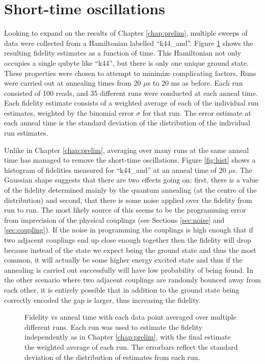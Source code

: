 \section{Short-time oscillations}
Looking to expand on the results of Chapter \ref{chap:prelim}, multiple sweeps of data were collected from a Hamiltonian labelled ``k44\_and''.  Figure \ref{fig:results_avg} shows the resulting fidelity estimates as a function of time.  This Hamiltonian not only occupies a single qubyte like ``k44'', but there is only one unique ground state.  These properties were chosen to attempt to minimize complicating factors.  Runs were carried out at annealing times from 20 $\mu$s to 20 ms as before.  Each run consisted of 100 reads, and 35 different runs were conducted at each anneal time.  Each fidelity estimate consists of a weighted average of each of the individual run estimates, weighted by the binomial error $\sigma$ for that run.
The error estimate at each anneal time is the standard deviation of the distribution of the individual run estimates.

Unlike in Chapter \ref{chap:prelim}, averaging over many runs at the same anneal time has managed to remove the short-time oscillations.  Figure \ref{fig:hist} shows a histogram of fidelities measured for ``k44\_and'' at an anneal time of 20 $\mu$s.  The Gaussian shape suggests that there are two effects going on: first, there is a value of the fidelity determined mainly by the quantum annealing (at the centre of the distribution) and second, that there is some noise applied over the fidelity from run to run.  The most likely source of this seems to be the programming error from imprecision of the physical couplings (see Sections \ref{sec:noise} and \ref{sec:coupling}).  If the noise in programming the couplings is high enough that if two adjacent couplings end up close enough together then the fidelity will drop because instead of the state we expect being the ground state and thus the most common, it will actually be some higher energy excited state and thus if the annealing is carried out successfully will have low probability of being found.  In the other scenario where two adjacent couplings are randomly bounced away from each other, it is entirely possible that in addition to the ground state being correctly encoded the gap is larger, thus increasing the fidelity.

\begin{figure}
	\caption[Averaged Anneal Results]{Fidelity vs anneal time with each data point averaged over multiple different runs.  Each run was used to estimate the fidelity independently as in Chapter \ref{chap:prelim}, with the final estimate the weighted average of each run.  The errorbars reflect the standard deviation of the distribution of estimates from each run.}
	\label{fig:results_avg}
\end{figure}

